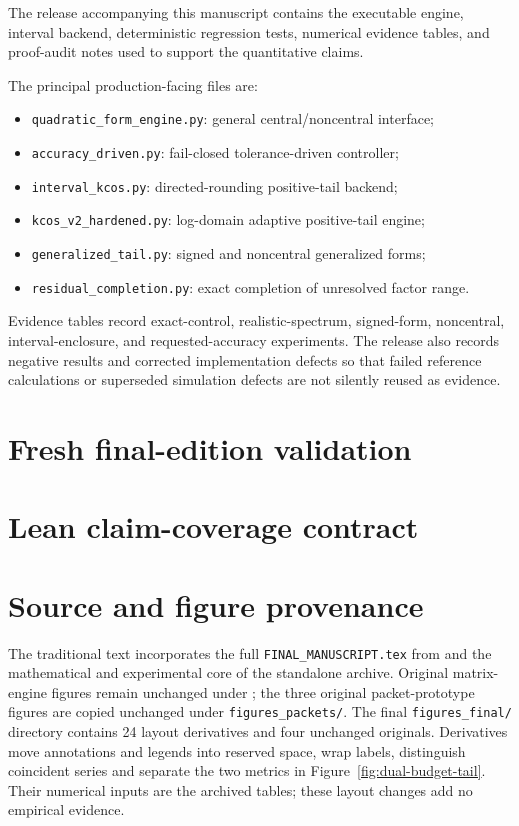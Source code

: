 \documentclass[11pt]{article}
\theoremstyle{definition}
\theoremstyle{remark}
\begin{document}
The release accompanying this manuscript contains the executable engine,
interval backend, deterministic regression tests, numerical evidence tables,
and proof-audit notes used to support the quantitative claims.

The principal production-facing files are:

\begin{itemize}
\item \texttt{quadratic\_form\_engine.py}: general central/noncentral interface;
\item \texttt{accuracy\_driven.py}: fail-closed tolerance-driven controller;
\item \texttt{interval\_kcos.py}: directed-rounding positive-tail backend;
\item \texttt{kcos\_v2\_hardened.py}: log-domain adaptive positive-tail engine;
\item \texttt{generalized\_tail.py}: signed and noncentral generalized forms;
\item \texttt{residual\_completion.py}: exact completion of unresolved factor
range.
\end{itemize}

Evidence tables record exact-control, realistic-spectrum, signed-form,
noncentral, interval-enclosure, and requested-accuracy experiments.  The
release also records negative results and corrected implementation defects so
that failed reference calculations or superseded simulation defects are not
silently reused as evidence.



\section{Fresh final-edition validation}\label{app:fresh-validation}


\section{Lean claim-coverage contract}\label{app:lean-contract}


\section{Source and figure provenance}\label{app:provenance}
The traditional text incorporates the full
\texttt{FINAL\_MANUSCRIPT.tex} from
and the mathematical and experimental core of the standalone
archive. Original matrix-engine figures remain unchanged under
; the three original packet-prototype figures
are copied unchanged under \texttt{figures\_packets/}. The final
\texttt{figures\_final/} directory contains 24 layout derivatives and four
unchanged originals. Derivatives move annotations and legends into reserved
space, wrap labels, distinguish coincident series and separate the two
metrics in Figure~\ref{fig:dual-budget-tail}. Their numerical inputs
are the archived tables; these layout changes add no empirical evidence.
\end{document}
